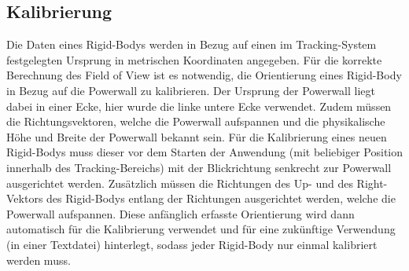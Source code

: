 \documentclass[]{article}
\newcommand{\POW}{Powerwall}
\newcommand{\FOV}{Field of View}
\begin{document}
\subsection{Kalibrierung}
Die Daten eines Rigid-Bodys werden in Bezug auf einen im Tracking-System festgelegten Ursprung in metrischen Koordinaten angegeben.
Für die korrekte Berechnung des \FOV{} ist es notwendig, die Orientierung eines Rigid-Body in Bezug auf die \POW{} zu kalibrieren.
Der Ursprung der \POW{} liegt dabei in einer Ecke, hier wurde die linke untere Ecke verwendet. Zudem müssen die Richtungsvektoren, welche die \POW{} aufspannen und die physikalische Höhe und Breite der \POW{} bekannt sein.
Für die Kalibrierung eines neuen Rigid-Bodys muss dieser vor dem Starten der Anwendung (mit beliebiger Position innerhalb des Tracking-Bereichs) mit der Blickrichtung senkrecht zur \POW{} ausgerichtet werden.
Zusätzlich müssen die Richtungen des \glqq{}Up\grqq{}- und des \glqq{}Right\grqq{}-Vektors des Rigid-Bodys entlang der Richtungen ausgerichtet werden, welche die \POW{} aufspannen.
Diese anfänglich erfasste Orientierung wird dann automatisch für die Kalibrierung verwendet und für eine zukünftige Verwendung (in einer Textdatei) hinterlegt, sodass jeder Rigid-Body nur einmal kalibriert werden muss.


\end{document}
